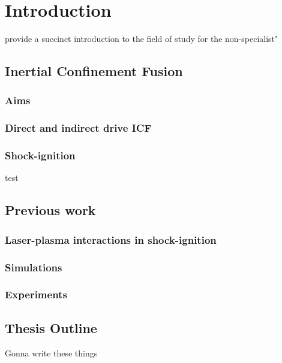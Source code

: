 \chapter{Introduction}
\label{chp:introduction}
provide a succinct introduction to the field of study for the non-specialist"

\section{Inertial Confinement Fusion}
\subsection{Aims}
\subsection{Direct and indirect drive ICF}
\subsection{Shock-ignition}
test\cite{Rib2009}


\section{Previous work}
\subsection{Laser-plasma interactions in shock-ignition}
\subsection{Simulations}
\subsection{Experiments}

\section{Thesis Outline}
Gonna write these things



